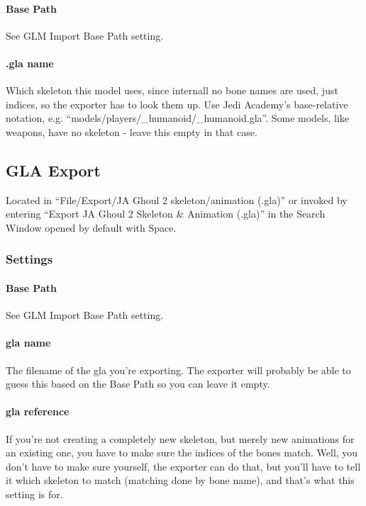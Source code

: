 \documentclass[a4paper,10pt]{article}
\begin{document}
 \paragraph*{Base Path}
 See GLM Import Base Path setting.
 
 \paragraph*{.gla name}
 Which skeleton this model uses, since internall no bone names are used, just indices, so the exporter has
 to look them up. Use Jedi Academy's base-relative notation, e.g. ``models/players/\_humanoid/\_humanoid.gla''.
 Some models, like weapons, have no skeleton - leave this empty in that case.
 
 
 \subsection{GLA Export}
 
 Located in ``File/Export/JA Ghoul 2 skeleton/animation (.gla)'' or invoked by entering ``Export JA Ghoul 2 
 Skeleton \& Animation (.gla)'' in the Search Window opened by default with Space.
 
 \subsubsection*{Settings}
 
 \paragraph*{Base Path}
 See GLM Import Base Path setting.
 
 \paragraph*{gla name}
 The filename of the gla you're exporting. The exporter will probably be able to guess this based on the
 Base Path so you can leave it empty.
 
 \paragraph*{gla reference}
 If you're not creating a completely new skeleton, but merely new animations for an existing one, you have
 to make sure the indices of the bones match. Well, you don't have to make sure yourself, the exporter can
 do that, but you'll have to tell it which skeleton to match (matching done by bone name), and that's what
 this setting is for.
 
\end{document}
